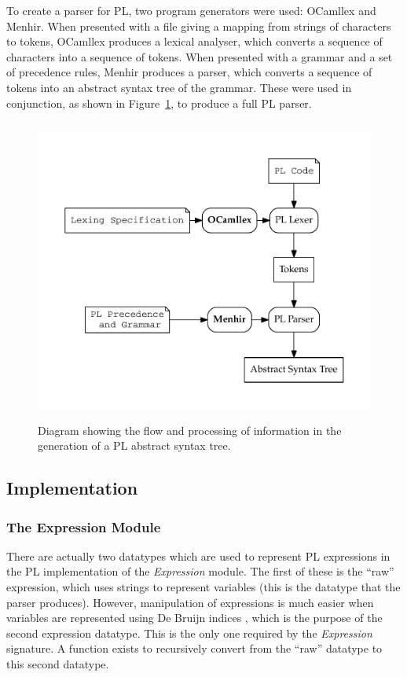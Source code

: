 \documentclass[12pt,a4paper,twoside,openright]{report}
\begin{document}
To create a parser for PL, two program generators were used:
OCamllex and Menhir. When presented with a
file giving a mapping from strings of characters to tokens,
OCamllex produces a lexical analyser, which converts a sequence
of characters into a sequence of tokens. When presented with a
grammar and a set of precedence rules, Menhir produces a parser,
which converts a sequence of tokens into an abstract syntax tree
of the grammar. These were used in conjunction, as shown in
Figure~\ref{fig:parsing}, to produce a full PL parser.

\begin{figure}
	\centering
	\includegraphics[height=10cm]{parsing}
	\caption{Diagram showing the flow and processing of
		information in the generation of a PL abstract
		syntax tree.}
	\label{fig:parsing}
\end{figure}

\subsection{Implementation}

\subsubsection{The Expression Module}
There are actually two datatypes which are used to
represent PL expressions in the
PL implementation of the \emph{Expression} module.
The first of these is the ``raw'' expression, which
uses strings to represent variables (this is the
datatype that the parser produces). However,
manipulation of expressions is much easier when
variables are represented using De Bruijn indices \cite{debr72},
which is the purpose of the second expression datatype.
This is the only one required by the \emph{Expression}
signature. A function exists to recursively convert
from the ``raw'' datatype to this second datatype.
\end{document}
